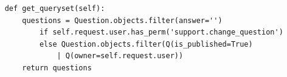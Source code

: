 \documentclass[12pt, a4paper, oneside]{article}
\begin{document}
\begin{enumerate}[wide, labelindent=0pt]
{\begin{verbatim}
    def get_queryset(self):
        questions = Question.objects.filter(answer='') 
            if self.request.user.has_perm('support.change_question') 
            else Question.objects.filter(Q(is_published=True) 
                | Q(owner=self.request.user))
        return questions
        \end{verbatim}
    }
\end{enumerate}
\newpage
\end{document}
